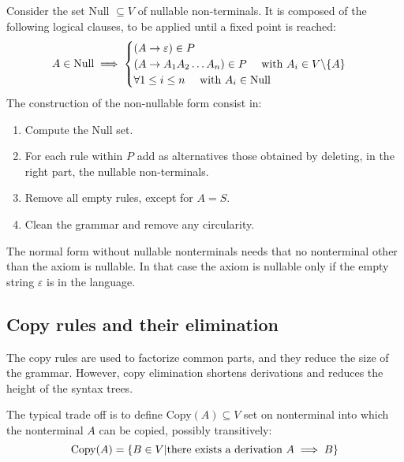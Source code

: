 Consider the set Null $\subseteq V$ of nullable non-terminals. 
It is composed of the following logical clauses, to be applied until a fixed point is reached:
\[A \in \textnormal{Null} \implies
\begin{cases}
    (A \rightarrow \varepsilon) \in P\\
    (A \rightarrow A_1A_2\dots A_n) \in P \:\:\:\:\:\: \textnormal{with } A_i \in V \backslash \{A\} \\
    \forall 1 \leq i \leq n \:\:\:\:\:\: \textnormal{with } A_i \in \textnormal{Null}
\end{cases}    
\]
The construction of the non-nullable form consist in:
\begin{enumerate}
    \item Compute the Null set. 
    \item For each rule within $P$ add as alternatives those obtained by deleting, in the right part, the nullable non-terminals. 
    \item Remove all empty rules, except for $A=S$. 
    \item Clean the grammar and remove any circularity. 
\end{enumerate}
The normal form without nullable nonterminals needs that no nonterminal other than the axiom is nullable. 
In that case the axiom is nullable only if the empty string $\varepsilon$ is in the language. 

















\subsection*{Copy rules and their elimination}
The copy rules are used to factorize common parts, and they reduce the size of the grammar. 
However, copy elimination shortens derivations and reduces the height of the syntax trees. 

The typical trade off is to define Copy$(A)\subseteq V$ set on nonterminal into which the nonterminal $A$ can be copied, possibly transitively:
\[\textnormal{Copy}(A)=\{B \in V | \textnormal{there exists a derivation } A \implies B\}\]

